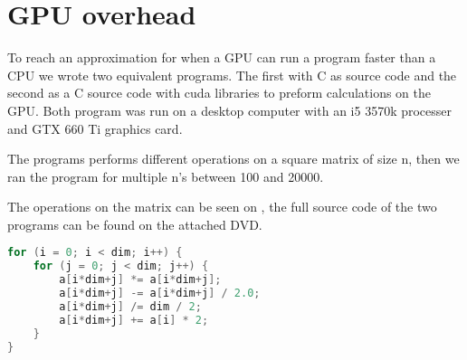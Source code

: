 \chapter{GPU overhead}
\label{app:gpuoverhead}
To reach an approximation for when a GPU can run a program faster than a CPU  we wrote two equivalent programs.
The first with C as source code and the second as a C source code with \gls{cuda} libraries to preform calculations on the GPU.
Both program was run on a desktop computer with an i5 3570k processer and GTX 660 Ti graphics card.

The programs performs different operations on a square matrix of size n, then we ran the program for multiple n's between 100 and 20000.

The operations on the matrix can be seen on , the full source code of the two programs can be found on the attached DVD.

\begin{lstlisting}[language=C,caption={Operations on the matrix},label=gpuoversource,frame=single]
for (i = 0; i < dim; i++) {
	for (j = 0; j < dim; j++) {
		a[i*dim+j] *= a[i*dim+j];
		a[i*dim+j] -= a[i*dim+j] / 2.0;
		a[i*dim+j] /= dim / 2;
		a[i*dim+j] += a[i] * 2;
	}
}
\end{lstlisting}


